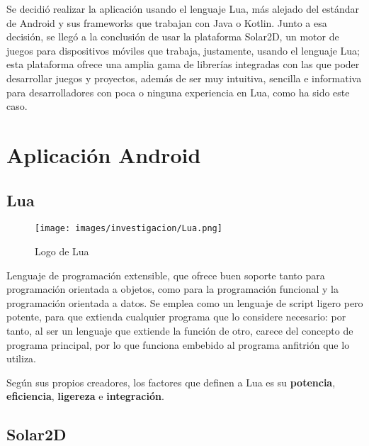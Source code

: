     Se decidió realizar la aplicación usando el lenguaje Lua, más alejado del estándar de Android y sus frameworks que trabajan con Java o Kotlin. Junto a esa decisión, se llegó a la conclusión de usar la plataforma Solar2D, un motor de juegos para dispositivos móviles que trabaja, justamente, usando el lenguaje Lua; esta plataforma ofrece una amplia gama de librerías integradas con las que poder desarrollar juegos y proyectos, además de ser muy intuitiva, sencilla e informativa para desarrolladores con poca o ninguna experiencia en Lua, como ha sido este caso.


    \section{Aplicación Android}

        \subsection{Lua}
        \label{inv:lua}

            \nocite{Manual-Lua}

            \begin{figure*}[h]
            \label{figura:lua}

                \centering
                \texttt{[image: images/investigacion/Lua.png]}
                \caption{Logo de Lua}

            \end{figure*}

            Lenguaje de programación extensible, que ofrece buen soporte tanto para programación orientada a objetos, como para la programación funcional y la programación orientada a datos. Se emplea como un lenguaje de script ligero pero potente, para que extienda cualquier programa que lo considere necesario: por tanto, al ser un lenguaje que extiende la función de otro, carece del concepto de programa principal, por lo que funciona embebido al programa anfitrión que lo utiliza.

            Según sus propios creadores, los factores que definen a Lua es su \textbf{potencia}, \textbf{eficiencia}, \textbf{ligereza} e \textbf{integración}.

            \newpage


        \subsection{Solar2D}

